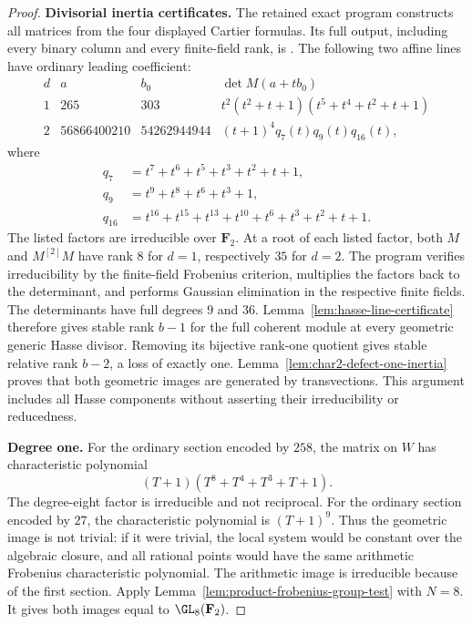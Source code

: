\begin{proof}
\par\smallskip\noindent\textbf{Divisorial inertia certificates.}
The retained exact program
constructs all matrices from the four displayed Cartier formulas.
Its full output, including every binary column and every finite-field
rank, is
.
The following two affine lines have ordinary leading coefficient:
\[
 \begin{array}{c|r|r|l}
 d&a&b_0&\det M(a+t b_0)\\ \hline
 1&265&303&t^2(t^2+t+1)(t^5+t^4+t^2+t+1)\\
 2&56866400210&54262944944&(t+1)^4q_7(t)q_9(t)q_{16}(t),
 \end{array}
\]
where
\[
\begin{split}
 q_7&=t^7+t^6+t^5+t^3+t^2+t+1,\\
 q_9&=t^9+t^8+t^6+t^3+1,\\
 q_{16}&=t^{16}+t^{15}+t^{13}+t^{10}+t^6+t^3+t^2+t+1.
\end{split}
\]
The listed factors are irreducible over $\mathbf F_2$.
At a root of each listed factor, both $M$ and $M^{[2]}M$
have rank $8$ for $d=1$, respectively $35$ for $d=2$.
The program verifies irreducibility by the finite-field Frobenius
criterion, multiplies the factors back to the determinant, and
performs Gaussian elimination in the respective finite fields.
The determinants have full degrees $9$ and $36$.
Lemma~\ref{lem:hasse-line-certificate} therefore gives stable rank
$b-1$ for the full coherent module at every geometric generic
Hasse divisor.  Removing its bijective rank-one quotient gives
stable relative rank $b-2$, a loss of exactly one.
Lemma~\ref{lem:char2-defect-one-inertia} proves that both geometric
images are generated by transvections.  This argument includes
all Hasse components without asserting their irreducibility or
reducedness.

\par\smallskip\noindent\textbf{Degree one.}
For the ordinary section encoded by $258$, the matrix on $W$
has characteristic polynomial
\[
 (T+1)(T^8+T^4+T^3+T+1).
\]
The degree-eight factor is irreducible and not reciprocal.
For the ordinary section encoded by $27$, the characteristic
polynomial is $(T+1)^9$.
Thus the geometric image is not trivial: if it were trivial,
the local system would be constant over the algebraic closure,
and all rational points would have the same arithmetic Frobenius
characteristic polynomial.  The arithmetic image is irreducible
because of the first section.  Apply
Lemma~\ref{lem:product-frobenius-group-test} with $N=8$.
It gives both images equal to $\GL_8(\mathbf F_2)$.


\end{proof}

